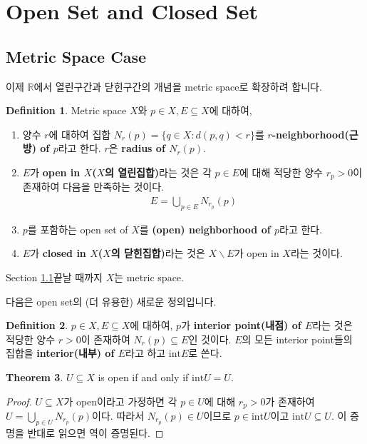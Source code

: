 \documentclass[12pt]{article}
\theoremstyle{definition}
\newtheorem{thm}{Theorem}[section]
\newtheorem{defn}[thm]{Definition}
\begin{document}
\section{Open Set and Closed Set} 

\subsection{Metric Space Case} \label{sec metric open}


이제 \(\mathbb{R}\)에서 열린구간과 닫힌구간의 개념을 metric space로 확장하려 합니다. 

	\begin{defn} \label{def metric top}
		Metric space \(X\)와 \(p \in X, E \subseteq X\)에 대하여,
		\begin{enumerate}[label=(\alph*), leftmargin=2\parindent]
			\item
			양수 \(r\)에 대하여 집합 \(N_r (p) = \{q \in X : d(p, q) < r\}\)를 \textbf{\(r\)-neighborhood(근방) of \(p\)}라고 한다. \(r\)은 \textbf{radius of \(N_r (p)\)}.
			\item
			\(E\)가 \textbf{open in \(X\)(\(X\)의 열린집합)}라는 것은 각 \(p \in E\)에 대해 적당한 양수 \(r_p > 0\)이 존재하여 다음을 만족하는 것이다.
			\begin{gather*}
				E = \bigcup_{p \in E} N_{r_p}(p)
			\end{gather*}
			\item
			\(p\)를 포함하는 open set of \(X\)를 \textbf{(open) neighborhood of \(p\)}라고 한다.
			\item
			\(E\)가 \textbf{closed in \(X\)(\(X\)의 닫힌집합)}라는 것은 \(X \backslash E\)가 open in \(X\)라는 것이다.
		\end{enumerate}
		
	\end{defn}

Section \ref{sec metric open}\이 끝날 때까지 \(X\)는 metric space.

다음은 open set의 (더 유용한) 새로운 정의입니다.

	\begin{defn}
		\(p \in X, E \subseteq X\)에 대하여, \(p\)가 \textbf{interior point(내점) of \(E\)}라는 것은 적당한 양수 \(r > 0\)이 존재하여 \(N_r (p) \subseteq E\)인 것이다. \(E\)의 모든 interior point들의 집합을 \textbf{interior(내부) of \(E\)}라고 하고 \(\text{int}E\)로 쓴다.
	\end{defn}

	\begin{thm}
		\(U \subseteq X\) is open if and only if \(\text{int}U = U\).
	\end{thm}
	\begin{proof}
		\(U \subseteq X\)가 open이라고 가정하면 각 \(p \in U\)에 대해 \(r_p > 0\)가 존재하여 \(U = \bigcup_{p \in U} N_{r_p}(p)\)이다. 따라서 \(N_{r_p}(p) \in U\)이므로 \(p \in \text{int}U\)이고 \(\text{int}U \subseteq U\). 이 증명을 반대로 읽으면 역이 증명된다.
	\end{proof}
\end{document}
